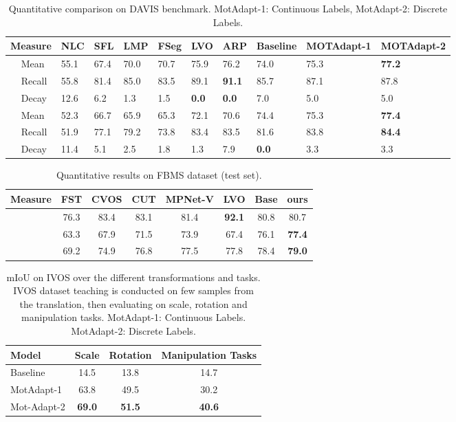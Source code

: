 \documentclass[letterpaper, 10 pt, conference]{ieeeconf}
\begin{document}
\begin{table*}[ht!]
\centering
\caption{Quantitative comparison on DAVIS benchmark. MotAdapt-1: Continuous Labels, MotAdapt-2: Discrete Labels. }
\label{table:soa}
\begin{tabular}{|l|l|l|l|l|l|l|l|l|l|l|}
\hline
\multicolumn{2}{|l|}{Measure} & NLC\cite{faktor2014video} & SFL\cite{cheng2017segflow} & LMP \cite{tokmakov2016learning} & FSeg \cite{jain2017fusionseg} & LVO \cite{tokmakov2017learning} & ARP \cite{kohprimary} & Baseline & MOTAdapt-1 & MOTAdapt-2 \\ \hline
\multirow{3}{*}{} & Mean & 55.1 & 67.4 & 70.0 & 70.7 & 75.9 & 76.2 & 74.0 & 75.3 & \textbf{77.2} \\ & Recall & 55.8 & 81.4 & 85.0 & 83.5 & 89.1 & \textbf{91.1} & 85.7 & 87.1 & 87.8 \\ & Decay & 12.6 & 6.2 & 1.3 & 1.5 & \textbf{0.0} & \textbf{0.0} & 7.0 & 5.0 & 5.0 \\ \hline
\multirow{3}{*}{} & Mean & 52.3 & 66.7 & 65.9 & 65.3 & 72.1 & 70.6 & 74.4 & 75.3 & \textbf{77.4} \\ & Recall & 51.9 & 77.1 & 79.2 & 73.8 & 83.4 & 83.5 & 81.6 & 83.8 & \textbf{84.4} \\ & Decay & 11.4 & 5.1 & 2.5 & 1.8 & 1.3 & 7.9 & \textbf{0.0} & 3.3 & 3.3 \\ \hline
\end{tabular}
\end{table*}

\begin{table*}[ht!]
\centering
\caption{Quantitative results on FBMS dataset (test set).}
\label{table:fbms}
\begin{tabular}{|l|c|c|c|c|c|c|c|}
\hline
Measure & FST \cite{papazoglou2013fast} & CVOS \cite{taylor2015causal} & CUT \cite{keuper2015motion} & MPNet-V\cite{tokmakov2016learning}  & LVO\cite{tokmakov2017learning} & Base & ours  \\ \hline
 & 76.3 & 83.4 & 83.1 & 81.4 & \textbf{92.1} & 80.8 & 80.7 \\
 & 63.3 & 67.9 & 71.5 & 73.9 & 67.4 & 76.1 & \textbf{77.4} \\
 & 69.2 & 74.9 & 76.8 & 77.5 & 77.8 & 78.4 & \textbf{79.0} \\ \hline
\end{tabular}
\end{table*}

\begin{table*}[]
\caption{mIoU on IVOS over the different transformations and tasks. IVOS dataset teaching is conducted on few samples from the translation, then evaluating on scale, rotation and manipulation tasks. MotAdapt-1: Continuous Labels. MotAdapt-2: Discrete Labels.}
\centering
\begin{tabular}{|l|c|c|c|}
\hline
Model & Scale & Rotation & Manipulation Tasks \\ \hline
Baseline & 14.5 & 13.8 & 14.7 \\ 
MotAdapt-1 & 63.8 & 49.5 & 30.2 \\ 
Mot-Adapt-2 & \textbf{69.0} & \textbf{51.5} & \textbf{40.6} \\ \hline
\end{tabular}
\label{table:fordsm}
\end{table*}
\end{document}
